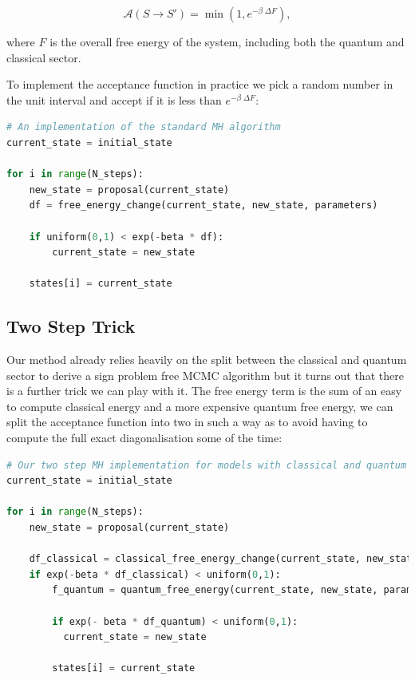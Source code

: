 \[
\mathcal{A}(S \to S') = \min\left(1, e^{-\beta\;\Delta F}\right),
\]

where \(F\) is the overall free energy of the system, including both the quantum and classical sector.

To implement the acceptance function in practice we pick a random number in the unit interval and accept if it is less than \(e^{-\beta\;\Delta F}\):

\begin{lstlisting}[language=Python]
# An implementation of the standard MH algorithm
current_state = initial_state

for i in range(N_steps):
    new_state = proposal(current_state)
    df = free_energy_change(current_state, new_state, parameters)

    if uniform(0,1) < exp(-beta * df):
        current_state = new_state
        
    states[i] = current_state
\end{lstlisting}

\hypertarget{app-mcmc-two-step-trick}{%
\subsection{Two Step Trick}\label{app-mcmc-two-step-trick}}

Our method already relies heavily on the split between the classical and quantum sector to derive a sign problem free MCMC algorithm but it turns out that there is a further trick we can play with it. The free energy term is the sum of an easy to compute classical energy and a more expensive quantum free energy, we can split the acceptance function into two in such a way as to avoid having to compute the full exact diagonalisation some of the time:

\begin{lstlisting}[language=Python]
# Our two step MH implementation for models with classical and quantum energy terms
current_state = initial_state

for i in range(N_steps):
    new_state = proposal(current_state)

    df_classical = classical_free_energy_change(current_state, new_state, parameters)
    if exp(-beta * df_classical) < uniform(0,1):
        f_quantum = quantum_free_energy(current_state, new_state, parameters)
    
        if exp(- beta * df_quantum) < uniform(0,1):
          current_state = new_state
    
        states[i] = current_state
    
\end{lstlisting}

